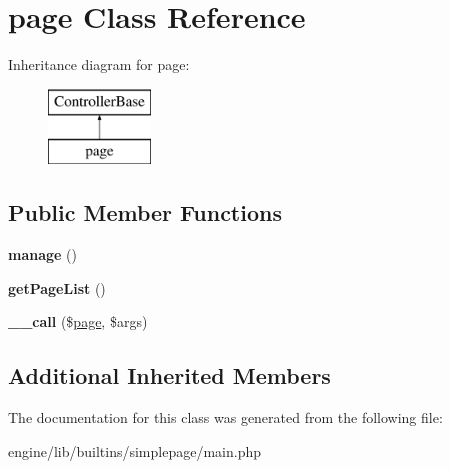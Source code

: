 \hypertarget{classpage}{\section{page Class Reference}
\label{classpage}
}
Inheritance diagram for page\-:\begin{figure}[H]
\begin{center}
\leavevmode
\includegraphics[height=2.000000cm]{classpage}
\end{center}
\end{figure}
\subsection*{Public Member Functions}
\begin{DoxyCompactItemize}
\item 
\hypertarget{classpage_a22f2a51542b9d8a22683743ff8b6d1aa}{{\bfseries manage} ()}\label{classpage_a22f2a51542b9d8a22683743ff8b6d1aa}

\item 
\hypertarget{classpage_a4034d78410d6a7a1270bdfaefa823d48}{{\bfseries get\-Page\-List} ()}\label{classpage_a4034d78410d6a7a1270bdfaefa823d48}

\item 
\hypertarget{classpage_a77972baf3b380c4f75ee810942713067}{{\bfseries \-\_\-\-\_\-call} (\$\hyperlink{classpage}{page}, \$args)}\label{classpage_a77972baf3b380c4f75ee810942713067}

\end{DoxyCompactItemize}
\subsection*{Additional Inherited Members}


The documentation for this class was generated from the following file\-:\begin{DoxyCompactItemize}
\item 
engine/lib/builtins/simplepage/main.\-php\end{DoxyCompactItemize}
